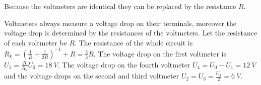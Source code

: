 {\ifEngHint
Because the voltmeters are identical they can be replaced by the resistance $R$.
\fi


\ifEngSolution
Voltmeters always measure a voltage drop on their terminals, moreover the voltage drop is determined by the resistances of the voltmeters. Let the resistance of each voltmeter be $R$. The resistance of the whole circuit is $R_k=\left(\frac{1}{R}+\frac{1}{2R}\right)^{-1}+R=\frac{5}{3}R$. The voltage drop on the first voltmeter is $U_1=\frac{R}{R_k}U_0=\SI{18}{V}$. The voltage drop on the fourth voltmeter $U_4=U_0-U_1=\SI{12}{V}$ and the voltage drops on the second and third voltmeter $U_2=U_3=\frac{U_4}{2}=\SI{6}{V}$.
\fi
}